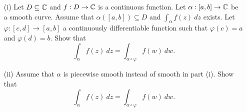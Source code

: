 \documentclass[a4paper]{article}
\begin{document}
\begin{problem}
    \begin{enumerate}
        \item[(i)] Let \( D \subseteq \mathbb{C}  \) and \( f : D \to \mathbb{C}  \) is a continuous function. Let \( \alpha : [a,b] \to \mathbb{C}  \) be a smooth curve. Assume that \( \alpha ([a,b]) \subseteq D  \) and \( \int_{ \alpha }^{  }  f(z) \ dz   \) exists. Let \( \varphi : [c,d] \to [a,b] \) a continuously differentiable function such that \( \varphi(c) = a  \) and \( \varphi (d) = b \). Show that 
            \[  \int_{ \alpha }^{  }  f(z) \ dz = \int_{ \alpha \circ \varphi }^{  }  f(w) \ dw. \]
        \item[(ii)] Assume that \( \alpha  \) is piecewise smooth instead of smooth in part (i). Show that 
            \[ \int_{ \alpha }^{  } f(z) \ dz = \int_{ \alpha \circ \varphi }^{  } f(w) \ dw. \]
    \end{enumerate} 
\end{problem}
\end{document}
